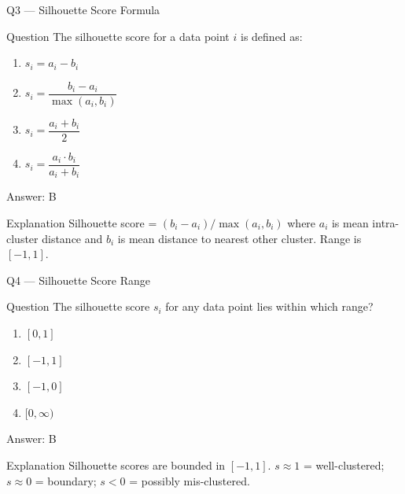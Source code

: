 \documentclass[aspectratio=169,8pt]{beamer}
\begin{document}
	\begin{frame}{Q3 --- Silhouette Score Formula}
		\begin{block}{Question}
			The silhouette score for a data point $i$ is defined as:
			\begin{enumerate}
				\item $s_i = a_i - b_i$
				\item $s_i = \dfrac{b_i - a_i}{\max(a_i, b_i)}$
				\item $s_i = \dfrac{a_i + b_i}{2}$
				\item $s_i = \dfrac{a_i \cdot b_i}{a_i + b_i}$
			\end{enumerate}
		\end{block}
		\begin{exampleblock}{Answer: B}\end{exampleblock}
		\begin{block}{Explanation}
			Silhouette score = $(b_i - a_i)/\max(a_i, b_i)$ where $a_i$ is mean intra-cluster distance and $b_i$ is mean distance to nearest other cluster. Range is $[-1, 1]$.
		\end{block}
	\end{frame}
	
	\begin{frame}{Q4 --- Silhouette Score Range}
		\begin{block}{Question}
			The silhouette score $s_i$ for any data point lies within which range?
			\begin{enumerate}
				\item $[0, 1]$
				\item $[-1, 1]$
				\item $[-1, 0]$
				\item $[0, \infty)$
			\end{enumerate}
		\end{block}
		\begin{exampleblock}{Answer: B}\end{exampleblock}
		\begin{block}{Explanation}
			Silhouette scores are bounded in $[-1, 1]$. $s \approx 1$ = well-clustered; $s \approx 0$ = boundary; $s < 0$ = possibly mis-clustered.
		\end{block}
	\end{frame}
	
\end{document}
